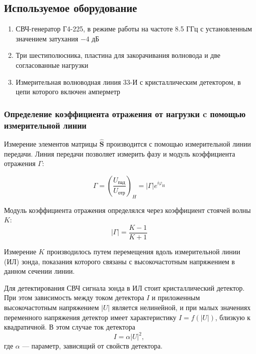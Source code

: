 \documentclass[a4paper,12pt]{article}
\newcommand\Smat{\hat { \mathbf { S } }}
\begin{document}
\subsection{Используемое оборудование}

\begin{enumerate}
	\item СВЧ-генератор Г4-225, в режиме работы на частоте 8.5 ГГц с установленным значением затухания $-4$ дБ
	\item Три шестиполюсника, пластина для закорачивания волновода и две согласованные нагрузки
	\item Измерительная волноводная линия 33-И с кристаллическим детектором, в цепи которого включен амперметр
\end{enumerate}

\subsubsection{Определение коэффициента отражения от нагрузки c помощью измерительной линии}

Измерение элементов матрицы $\Smat$ производится с помощью измерительной линии передачи. Линия передачи позволяет измерить фазу и модуль коэффициента отражения $\Gamma$:

\begin{equation}
	\Gamma=\left(\frac{U_\text{пад}}{U_\text{отр}}\right)_H= | \Gamma | e ^ { i \varphi _ { \mathrm { H } } }
\end{equation}

Модуль коэффициента отражения определялся через коэффициент стоячей волны $K$:
\begin{equation}
	| \Gamma | = \frac { K - 1 } { K + 1 }
\end{equation}

Измерение $K$ производилось путем перемещения вдоль измерительной линии (ИЛ) зонда, показания которого связаны с высокочастотным напряжением в данном сечении линии. 

Для детектирования СВЧ сигнала зонда в ИЛ стоит кристаллический детектор. 
При этом зависимость между током детектора $I$ и приложенным высокочастотным напряжением $|U|$ является нелинейной, и при малых значениях переменного напряжения детектор имеет характеристику $I=f(|U|)$, близкую к квадратичной. В этом случае ток детектора
\begin{equation}
	I=\alpha|U|^2,
\end{equation}
где $\alpha$ --- параметр, зависящий от свойств детектора.
\end{document}
